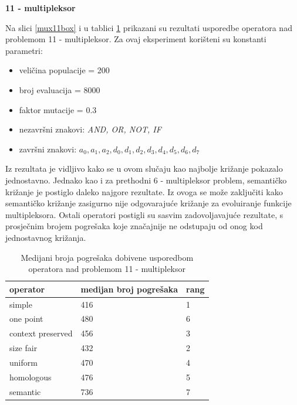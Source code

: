 \textbf{11 - multipleksor}

Na slici \ref{mux11box} i u tablici \ref{mux11table} prikazani su rezultati usporedbe operatora nad problemom 11 - multipleksor. Za ovaj eksperiment korišteni su konstanti parametri:
\begin{itemize}
\item{veličina populacije = 200}
\item{broj evaluacija = 8000}
\item{faktor mutacije = 0.3}
\item{nezavršni znakovi: \textit{AND, OR, NOT, IF}}
\item{završni znakovi: \textit{$a_0, a_1, a_2, d_0, d_1, d_2, d_3, d_4, d_5, d_6, d_7$}}
\end{itemize}

Iz rezultata je vidljivo kako se u ovom slučaju kao najbolje križanje pokazalo jednostavno. Jednako kao i za prethodni 6 - multipleksor problem, semantičko križanje je postiglo daleko najgore rezultate. Iz ovoga se može zaključiti kako semantičko križanje zasigurno nije odgovarajuće križanje za evoluiranje funkcije multipleksora. Ostali operatori postigli su sasvim zadovoljavajuće rezultate, s prosječnim brojem pogrešaka koje značajnije ne odstupaju od onog kod jednostavnog križanja.

\begin{table}[H]
 	\centering
  \caption{Medijani broja pogrešaka dobivene usporedbom operatora nad problemom 11 - multipleksor}
    \begin{tabular}{| l | l | l |}
    \hline
    \textbf{operator} & \textbf{medijan broj pogrešaka} & \textbf{rang}\\ \hline
    simple & 416 &1\\ \hline
    one point & 480 & 6\\ \hline
    context preserved & 456 & 3\\ \hline
    size fair & 432 & 2\\ \hline
    uniform & 470 & 4\\ \hline
    homologous & 476 & 5\\ \hline
    semantic & 736 & 7\\ \hline
    \end{tabular}
    
  
    \label{mux11table}
\end{table}

